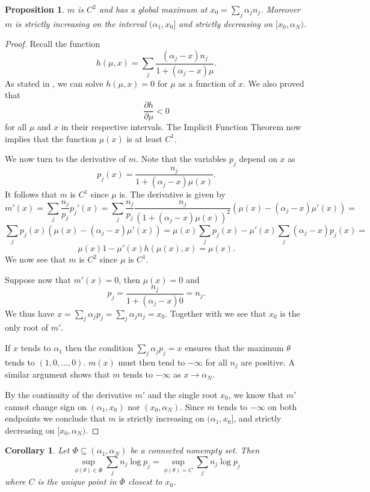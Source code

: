 \documentclass{article}
\theoremstyle{plain}
\newtheorem{proposition} {\bf Proposition} [section]
\newtheorem{corollary}   {\bf Corollary}   [section]
\theoremstyle{definition}
\begin{document}
\begin{proposition}
	$m$ is $C^2$ and has a global maximum at $x_0=\sum_j\alpha_jn_j$. 
	Moreover $m$ is strictly increasing on the interval $(\alpha_1,x_0]$
	and strictly decreasing on $[x_0,\alpha_N)$.
\end{proposition}
\begin{proof}
	Recall the function $$h(\mu,x)=\sum_j\frac{(\alpha_j-x)n_j}
	{1+(\alpha_j-x)\mu}.$$ As stated in , we can solve $h(\mu,x)=0$ for
	$\mu$ as a function of
	$x$. We also proved that $$\frac{\partial h}{\partial\mu}<0$$ for all $\mu$ and
	$x$ in their respective intervals. The Implicit Function Theorem \cite{wikipedia_implicit}
	now implies that the function $\mu(x)$ is at least $C^1$.

	We now turn to the derivative of $m$. Note that the variables $p_j$ depend on $x$ as
	$$p_j(x)=\frac{n_j}{1+(\alpha_j-x)\mu(x)}.$$ It follows that $m$ is $C^1$ since $\mu$ is.
	The derivative is given by $$m'(x)=\sum_j\frac{n_j}{p_j}p_j'(x)=\sum_j
	\frac{n_j}{p_j}\frac{n_j}{(1+(\alpha_j-x)\mu(x))^2}(\mu(x)-(\alpha_j-x)\mu'(x))=$$$$
	\sum_jp_j(x)(\mu(x)-(\alpha_j-x)\mu'(x))=
	\mu(x)\sum_jp_j(x)-\mu'(x)\sum_j(\alpha_j-x)p_j(x)=$$$$
	\mu(x)1-\mu'(x)h(\mu(x),x)=\mu(x).$$
	We now see that $m$ is $C^2$ since $\mu$ is $C^1$.

	Suppose now that $m'(x)=0$, then $\mu(x)=0$ and $$p_j=\frac{n_j}{1+(\alpha_j-x)0}=n_j.$$
	We thus have $x=\sum_j\alpha_jp_j=\sum_j\alpha_jn_j=x_0$. Together with  we
	see that $x_0$ is the only root of $m'$.

	If $x$ tends to $\alpha_1$ then the condition $\sum_j\alpha_jp_j=x$ ensures that the maximum
	$\theta$ tends to $(1,0,...,0)$. $m(x)$ must then tend to $-\infty$ for all $n_j$ are positive.
	A similar argument shows that $m$ tends to $-\infty$ as $x\to\alpha_N$.

	By the continuity of the derivative $m'$ and the single root $x_0$, we know that $m'$ cannot
	change sign on $(\alpha_1,x_0)$ nor $(x_0,\alpha_N)$. Since $m$ tends to $-\infty$ on both
	endpoints we conclude that $m$ is strictly increasing on $(\alpha_1,x_0]$, and strictly
	decreasing on $[x_0,\alpha_N)$.
\end{proof}

\begin{corollary}
	Let $\Phi\subseteq(\alpha_1,\alpha_N)$ be a connected nonempty set. Then
	$$\sup_{\phi(\theta)\in\Phi}\sum_jn_j\log p_j=\sup_{\phi(\theta)=C}\sum_jn_j\log p_j$$
	where $C$ is the unique point in $\overline{\Phi}$ closest to $x_0$.
\end{corollary}
\end{document}

